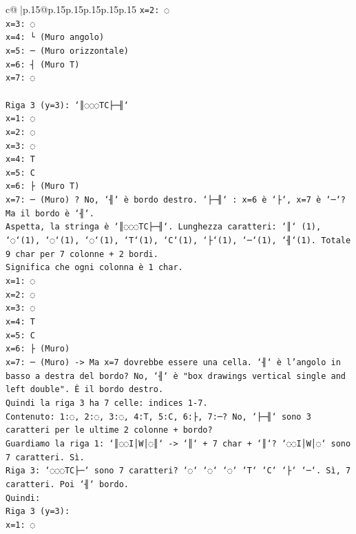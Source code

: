 \documentclass{article}
\begin{document}
{\begin{supertabular}{c@{$\;$}|p{.15\linewidth}@{}p{.15\linewidth}p{.15\linewidth}p{.15\linewidth}p{.15\linewidth}p{.15\linewidth}}
{{{\texttt{x=2: ◌} \\
\texttt{x=3: ◌} \\
\texttt{x=4: └ (Muro angolo)} \\
\texttt{x=5: ─ (Muro orizzontale)} \\
\texttt{x=6: ┤ (Muro T)} \\
\texttt{x=7: ◌} \\
\\ 
\texttt{Riga 3 (y=3): `║◌◌◌TC├─╢`} \\
\texttt{x=1: ◌} \\
\texttt{x=2: ◌} \\
\texttt{x=3: ◌} \\
\texttt{x=4: T} \\
\texttt{x=5: C} \\
\texttt{x=6: ├ (Muro T)} \\
\texttt{x=7: ─ (Muro) ? No, `╢` è bordo destro. `├─╢` : x=6 è `├`, x=7 è `─`? Ma il bordo è `╢`.} \\
\texttt{Aspetta, la stringa è `║◌◌◌TC├─╢`. Lunghezza caratteri: `║` (1), `◌`(1), `◌`(1), `◌`(1), `T`(1), `C`(1), `├`(1), `─`(1), `╢`(1). Totale 9 char per 7 colonne + 2 bordi.} \\
\texttt{Significa che ogni colonna è 1 char.} \\
\texttt{x=1: ◌} \\
\texttt{x=2: ◌} \\
\texttt{x=3: ◌} \\
\texttt{x=4: T} \\
\texttt{x=5: C} \\
\texttt{x=6: ├ (Muro)} \\
\texttt{x=7: ─ (Muro) {-}> Ma x=7 dovrebbe essere una cella. `╢` è l'angolo in basso a destra del bordo? No, `╢` è "box drawings vertical single and left double". È il bordo destro.} \\
\texttt{Quindi la riga 3 ha 7 celle: indices 1{-}7.} \\
\texttt{Contenuto: 1:◌, 2:◌, 3:◌, 4:T, 5:C, 6:├, 7:─? No, `├─╢` sono 3 caratteri per le ultime 2 colonne + bordo?} \\
\texttt{Guardiamo la riga 1: `║◌◌I│W│◌║` {-}> `║` + 7 char + `║`? `◌◌I│W│◌` sono 7 caratteri. Sì.} \\
\texttt{Riga 3: `◌◌◌TC├─` sono 7 caratteri? `◌` `◌` `◌` `T` `C` `├` `─`. Sì, 7 caratteri. Poi `╢` bordo.} \\
\texttt{Quindi:} \\
\texttt{Riga 3 (y=3):} \\
\texttt{x=1: ◌} \\
}}}
\end{supertabular}}
\end{document}
